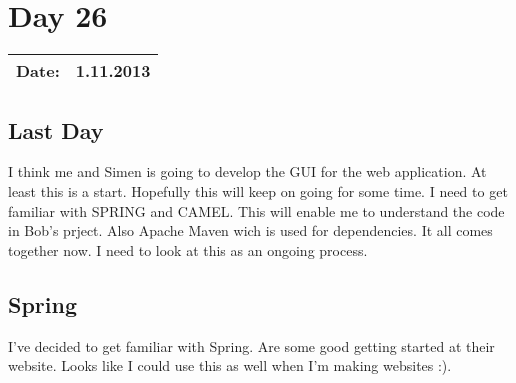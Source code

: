 \section{Day 26}
\begin{tabular}{|c|c|}
\hline
Date: & 1.11.2013 \\
\hline
\end{tabular}
\subsection{Last Day}
I think me and Simen is going to develop the GUI for the web application. At least this is a start. Hopefully this will keep on going for some time. I need to get familiar with SPRING and CAMEL. This will enable me to understand the code in Bob's prject. Also Apache Maven wich is used for dependencies. It all comes together now. I need to look at this as an ongoing process. 
\subsection{Spring}
I've decided to get familiar with Spring. Are some good getting started at their website. Looks like I could use this as well when I'm making websites :).
